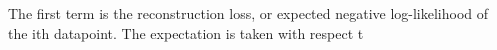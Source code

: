 \documentclass[11pt]{article}
\theoremstyle{definition}
\theoremstyle{theorem}
\begin{document}
The first term is the reconstruction loss, or expected negative log-likelihood of the ith datapoint. The expectation is taken with respect t
\end{document}
